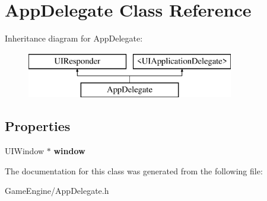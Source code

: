 \hypertarget{interface_app_delegate}{}\section{App\+Delegate Class Reference}
\label{interface_app_delegate}
Inheritance diagram for App\+Delegate\+:\begin{figure}[H]
\begin{center}
\leavevmode
\includegraphics[height=2.000000cm]{interface_app_delegate}
\end{center}
\end{figure}
\subsection*{Properties}
\begin{DoxyCompactItemize}
\item 
U\+I\+Window $\ast$ {\bfseries window}\hypertarget{interface_app_delegate_acf48ac24125e688cac1a85445cd7fac2}{}\label{interface_app_delegate_acf48ac24125e688cac1a85445cd7fac2}

\end{DoxyCompactItemize}


The documentation for this class was generated from the following file\+:\begin{DoxyCompactItemize}
\item 
Game\+Engine/App\+Delegate.\+h\end{DoxyCompactItemize}
